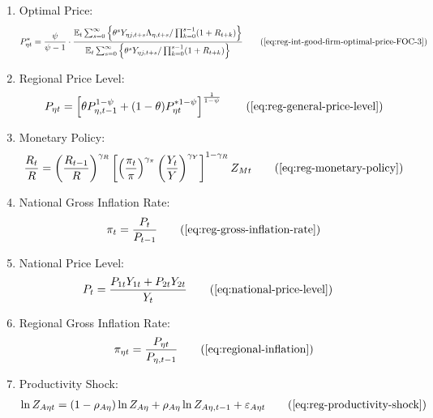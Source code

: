 \documentclass[
thesis.tex
]{subfiles}
\begin{document}
{\begin{itemize}
\begin{enumerate}
		\item Optimal Price:
		\begin{align}
			P_{\eta t}^{\ast} = \frac{\psi}{\psi-1} \cdot \frac{ \E \sum_{s=0}^{\infty} \left\{ \theta^s Y_{\eta j,t+s} \Lambda_{\eta, t+s} / \prod_{k=0}^{s-1}(1+R_{t+k}) \right\}} {\E \sum_{s=0}^{\infty} \left\{ \theta^s Y_{\eta j,t+s} / \prod_{k=0}^{s-1}(1 + R_{t+k}) \right\}} \tag{\ref{eq:reg-int-good-firm-optimal-price-FOC-3}}
		\end{align}
		
		\item Regional Price Level:
		\begin{align}
			P_{\eta t} = \left[ \theta P_{\eta,t-1}^{1-\psi} + (1-\theta) P_{\eta t}^{\ast 1-\psi} \right]^\frac{1}{1-\psi} \tag{\ref{eq:reg-general-price-level}}
		\end{align}
		
		\item Monetary Policy:
		\begin{align}
			\frac{R_{t}}{R} = \left( \frac{R_{t-1}}{R} \right)^{\gamma_R} \left[ \left( \frac{\pi_t}{\pi} \right)^{\gamma_\pi} \left( \frac{Y_{t}}{Y} \right)^{\gamma_Y} \right]^{1-\gamma_R} Z_{Mt} \tag{\ref{eq:reg-monetary-policy}}
		\end{align}
		
		\item National Gross Inflation Rate:
		\begin{align}
			\pi_t = \frac{P_t}{P_{t-1}} \tag{\ref{eq:reg-gross-inflation-rate}}
		\end{align}
		
		\item National Price Level:
		\begin{align}
			P_{t} &= \frac{P_{1t} Y_{1t} + P_{2t} Y_{2t}}{Y_{t}} \tag{\ref{eq:national-price-level}} %
		\end{align}
		
		\item Regional Gross Inflation Rate:
		\begin{align}
			\pi_{\eta t} = \frac{P_{\eta t}}{P_{\eta, t-1}} \tag{\ref{eq:regional-inflation}}
		\end{align}
		
		\item Productivity Shock:
		\begin{align}
			\ln{Z_{A\eta t}} = (1-\rho_{A\eta})\ln{Z_{A\eta}} + \rho_{A\eta}\ln{Z_{A\eta,t-1}} + \varepsilon_{A\eta t} \tag{\ref{eq:reg-productivity-shock}}
		\end{align}
		

\end{enumerate}
\end{itemize}}
\end{document}
